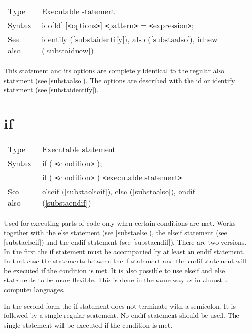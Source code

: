 \noindent \begin{tabular}{ll}
Type & Executable statement\\
Syntax & ido[ld] [{\tt<}options{\tt>}] {\tt<}pattern{\tt>} = {\tt<}expression{\tt>};
\\ See also & identify (\ref{substaidentify}),
              also (\ref{substaalso}),
              idnew (\ref{substaidnew})
\end{tabular}\vspace{4mm}

\noindent This statement and its options are completely 
identical to the regular also statement (see \ref{substaalso}). 
The options are described with the id or identify 
statement (see \ref{substaidentify}).
\vspace{10mm}

 
\section{if}
\label{substaif}

\noindent \begin{tabular}{ll}
Type & Executable statement\\
Syntax & if ( {\tt<}condition{\tt>} ); \\
       & if ( {\tt<}condition{\tt>} ) {\tt<}executable statement{\tt>}
\\ See also & elseif (\ref{substaelseif}),
              else (\ref{substaelse}),
              endif (\ref{substaendif})
\end{tabular} \vspace{4mm}

\noindent Used for executing parts of code only when certain 
conditions are met. Works together with the 
else statement (see \ref{substaelse}), the elseif 
statement (see \ref{substaelseif}) and the endif statement 
(see \ref{substaendif}). There are two versions. In the first the if 
statement must be accompanied by at least an endif statement. In that case 
the statements between the if statement and the endif statement will be 
executed if the condition is met. It is also possible to use elseif and 
else statements to be more flexible. This is done in the same way as in 
almost all computer languages.

\noindent In the second form the if statement does not terminate with a 
semicolon. It is followed by a single regular statement. 
No endif statement should be used. The single statement will be executed if 
the condition is met.

